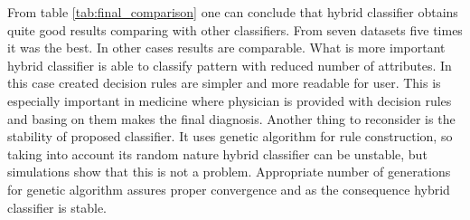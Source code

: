 From table \ref{tab:final_comparison} one can conclude that hybrid classifier
obtains quite good results comparing with other classifiers. From seven
datasets five times it was the best. In other cases results are comparable.
What is more important hybrid classifier is able to classify pattern with
reduced number of attributes. In this case created decision rules are simpler
and more readable for user. This is especially important in medicine where
physician is provided with decision rules and basing on them makes the final
diagnosis. Another thing to reconsider is the stability of proposed classifier.
It uses genetic algorithm for rule construction, so taking into account its
random nature hybrid classifier can be unstable, but simulations show that this
is not a problem. Appropriate number of generations for genetic algorithm
assures proper convergence and as the consequence hybrid classifier is stable. 
